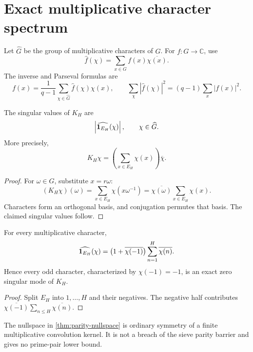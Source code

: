 \section{Exact multiplicative character spectrum}
\label{sec:character-spectrum}

Let \(\widehat G\) be the group of multiplicative characters of
\(G\).  For \(f:G\to\mathbb C\), use
\[
 \widehat f(\chi)
 =\sum_{x\in G}f(x)\overline{\chi(x)}.
\]
The inverse and Parseval formulas are
\[
 f(x)=\frac1{q-1}\sum_{\chi\in\widehat G}
 \widehat f(\chi)\chi(x),
 \qquad
 \sum_\chi|\widehat f(\chi)|^2
 =(q-1)\sum_x|f(x)|^2.
\]

\begin{theorem}
\label{thm:complete-spectrum}
The singular values of \(K_H\) are
\[
 \left|\widehat{\mathbf 1_{E_H}}(\chi)\right|,
 \qquad \chi\in\widehat G.
\]
More precisely,
\[
 K_H\chi
 =
 \left(\sum_{x\in E_H}\chi(x)\right)\overline\chi.
\]
\end{theorem}

\begin{proof}
For \(\omega\in G\), substitute \(x=r\omega\):
\[
 (K_H\chi)(\omega)
 =\sum_{x\in E_H}\chi(x\omega^{-1})
 =\overline{\chi(\omega)}
  \sum_{x\in E_H}\chi(x).
\]
Characters form an orthogonal basis, and conjugation permutes that
basis.  The claimed singular values follow.
\end{proof}

\begin{theorem}
\label{thm:parity-nullspace}
For every multiplicative character,
\begin{equation}
 \widehat{\mathbf 1_{E_H}}(\chi)
 =
 \bigl(1+\overline{\chi(-1)}\bigr)
 \sum_{n=1}^H\overline{\chi(n)}.
\label{eq:parity-factor}
\end{equation}
Hence every odd character, characterized by \(\chi(-1)=-1\), is an
exact zero singular mode of \(K_H\).
\end{theorem}

\begin{proof}
Split \(E_H\) into \(1,\ldots,H\) and their negatives.  The negative
half contributes
\(\overline{\chi(-1)}\sum_{n\le H}\overline{\chi(n)}\).
\end{proof}

\begin{remark}
The nullspace in \cref{thm:parity-nullspace} is ordinary symmetry of
a finite multiplicative convolution kernel.  It is not a breach of
the sieve parity barrier and gives no prime-pair lower bound.
\end{remark}


